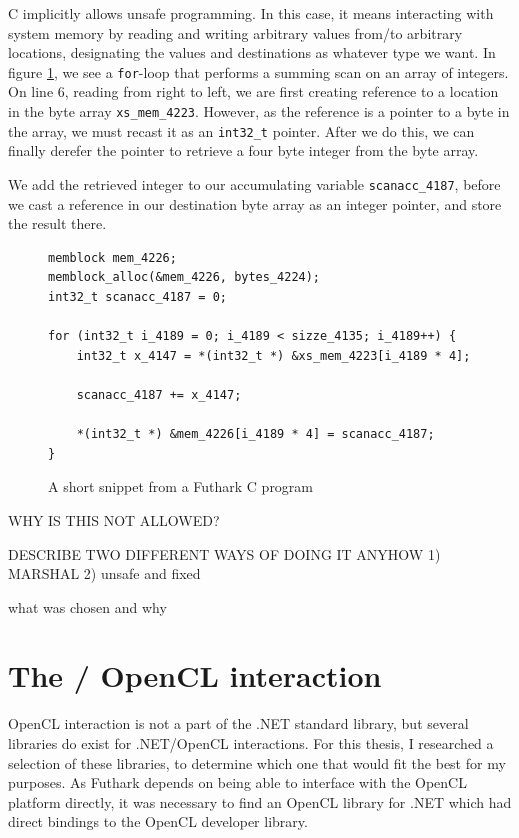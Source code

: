 C implicitly allows unsafe programming. In this case, it means interacting with system
memory by reading and writing arbitrary values from/to arbitrary locations,
designating the values and destinations as whatever type we want.
In figure \ref{fig:futharkcscene}, we see a \texttt{for}-loop that
performs a summing scan on an array of integers.
On line 6, reading from right to left, we are first creating reference to
a location in the byte array \texttt{xs\_mem\_4223}. However, as the reference
is a pointer to a byte in the array, we must recast it as an \texttt{int32\_t} pointer.
After we do this, we can finally derefer the pointer to retrieve a four byte
integer from the byte array.

We add the retrieved integer to our accumulating variable
\texttt{scanacc\_4187}, before we cast a reference in our destination byte array
as an integer pointer, and store the result there.

\begin{figure}
\centering
\begin{verbatim}
memblock mem_4226;
memblock_alloc(&mem_4226, bytes_4224);
int32_t scanacc_4187 = 0;

for (int32_t i_4189 = 0; i_4189 < sizze_4135; i_4189++) {
    int32_t x_4147 = *(int32_t *) &xs_mem_4223[i_4189 * 4];
    
    scanacc_4187 += x_4147;

    *(int32_t *) &mem_4226[i_4189 * 4] = scanacc_4187;
}
\end{verbatim}
\caption{A short snippet from a Futhark C program}
\label{fig:futharkcscene}
\end{figure}

WHY IS THIS NOT ALLOWED?

DESCRIBE TWO DIFFERENT WAYS OF DOING IT ANYHOW
1) MARSHAL
2) unsafe and fixed

what was chosen and why



\section*{The \csharp{} / OpenCL interaction}
OpenCL interaction is not a part of the .NET standard library, but several
libraries do exist for .NET/OpenCL interactions. For this thesis, I researched a
selection of these libraries, to determine which one that would fit the best for
my purposes.
As Futhark depends on being able to interface with the OpenCL platform directly,
it was necessary to find an OpenCL library for .NET which had direct bindings to
the OpenCL developer library.

